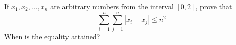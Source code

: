 If $x_1,x_2,\ldots,x_n$ are arbitrary numbers from the interval $[0,2]$, prove that
$$\sum_{i=1}^n\sum_{j=1}^n|x_i-x_j|\le n^2$$When is the equality attained?